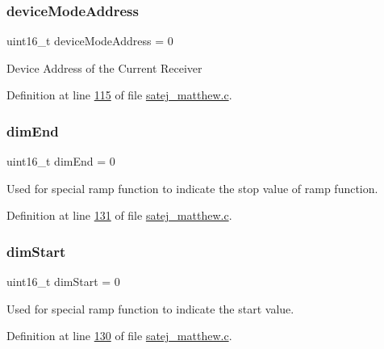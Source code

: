 \mbox{\label{satej__matthew_8c_aefd454f4f4d2d4dc52ea4a94145c0e93}} 
\subsubsection{\texorpdfstring{deviceModeAddress}{deviceModeAddress}}
{\footnotesize\ttfamily uint16\+\_\+t device\+Mode\+Address = 0}

Device Address of the Current Receiver 

Definition at line \mbox{\hyperlink{satej__matthew_8c_source_l00115}{115}} of file \mbox{\hyperlink{satej__matthew_8c_source}{satej\+\_\+matthew.\+c}}.

\mbox{\label{satej__matthew_8c_ac4542092d3e67f5fcb7f5ac24e6778c2}} 
\subsubsection{\texorpdfstring{dimEnd}{dimEnd}}
{\footnotesize\ttfamily uint16\+\_\+t dim\+End = 0}

Used for special ramp function to indicate the stop value of ramp function. 

Definition at line \mbox{\hyperlink{satej__matthew_8c_source_l00131}{131}} of file \mbox{\hyperlink{satej__matthew_8c_source}{satej\+\_\+matthew.\+c}}.

\mbox{\label{satej__matthew_8c_ad2e81110ac5d5101e2b8b67c4458bae3}} 
\subsubsection{\texorpdfstring{dimStart}{dimStart}}
{\footnotesize\ttfamily uint16\+\_\+t dim\+Start = 0}

Used for special ramp function to indicate the start value. 

Definition at line \mbox{\hyperlink{satej__matthew_8c_source_l00130}{130}} of file \mbox{\hyperlink{satej__matthew_8c_source}{satej\+\_\+matthew.\+c}}.

\mbox{\label{satej__matthew_8c_a2dfb3db6e969929dc4c426fc2a65cc69}} 
